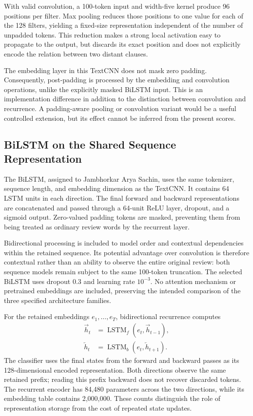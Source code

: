 With valid convolution, a 100-token input and width-five kernel produce 96 positions per filter. Max pooling reduces those positions to one value for each of the 128 filters, yielding a fixed-size representation independent of the number of unpadded tokens. This reduction makes a strong local activation easy to propagate to the output, but discards its exact position and does not explicitly encode the relation between two distant clauses.

The embedding layer in this TextCNN does not mask zero padding. Consequently, post-padding is processed by the embedding and convolution operations, unlike the explicitly masked BiLSTM input. This is an implementation difference in addition to the distinction between convolution and recurrence. A padding-aware pooling or convolution variant would be a useful controlled extension, but its effect cannot be inferred from the present scores.


\subsection{BiLSTM on the Shared Sequence Representation}
The BiLSTM, assigned to Jambhorkar Arya Sachin, uses the same tokenizer, sequence length, and embedding dimension as the TextCNN. It contains 64 LSTM units in each direction. The final forward and backward representations are concatenated and passed through a 64-unit ReLU layer, dropout, and a sigmoid output. Zero-valued padding tokens are masked, preventing them from being treated as ordinary review words by the recurrent layer.

Bidirectional processing is included to model order and contextual dependencies within the retained sequence. Its potential advantage over convolution is therefore contextual rather than an ability to observe the entire original review: both sequence models remain subject to the same 100-token truncation. The selected BiLSTM uses dropout 0.3 and learning rate $10^{-3}$. No attention mechanism or pretrained embeddings are included, preserving the intended comparison of the three specified architecture families.


For the retained embeddings $e_1,\ldots,e_T$, bidirectional recurrence computes
\begin{equation}
\begin{aligned}
\overrightarrow h_t&=\operatorname{LSTM}_f(e_t,\overrightarrow h_{t-1}),\\
\overleftarrow h_t&=\operatorname{LSTM}_b(e_t,\overleftarrow h_{t+1}).
\end{aligned}
\end{equation}
The classifier uses the final states from the forward and backward passes as its 128-dimensional encoded representation. Both directions observe the same retained prefix; reading this prefix backward does not recover discarded tokens. The recurrent encoder has 84,480 parameters across the two directions, while its embedding table contains 2,000,000. These counts distinguish the role of representation storage from the cost of repeated state updates.

